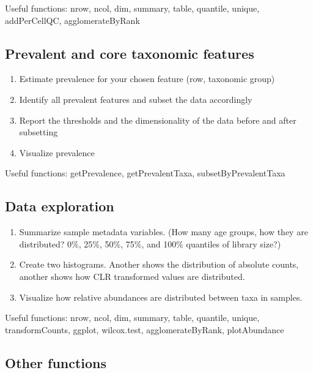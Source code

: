 \documentclass[
]{book}
\providecommand{\tightlist}{%
  \setlength{\itemsep}{0pt}\setlength{\parskip}{0pt}}
\begin{document}
Useful functions: nrow, ncol, dim, summary, table, quantile, unique, addPerCellQC, agglomerateByRank

\hypertarget{prevalent-and-core-taxonomic-features}{%
\subsection{Prevalent and core taxonomic features}\label{prevalent-and-core-taxonomic-features}}

\begin{enumerate}
\def\labelenumi{\arabic{enumi}.}
\tightlist
\item
  Estimate prevalence for your chosen feature (row, taxonomic group)
\item
  Identify all prevalent features and subset the data accordingly
\item
  Report the thresholds and the dimensionality of the data before and after subsetting
\item
  Visualize prevalence
\end{enumerate}

Useful functions: getPrevalence, getPrevalentTaxa, subsetByPrevalentTaxa

\hypertarget{data-exploration}{%
\subsection{Data exploration}\label{data-exploration}}

\begin{enumerate}
\def\labelenumi{\arabic{enumi}.}
\tightlist
\item
  Summarize sample metadata variables. (How many age groups, how they are distributed? 0\%, 25\%, 50\%, 75\%, and 100\% quantiles of library size?)
\item
  Create two histograms. Another shows the distribution of absolute counts, another shows how CLR transformed values are distributed.
\item
  Visualize how relative abundances are distributed between taxa in samples.
\end{enumerate}

Useful functions: nrow, ncol, dim, summary, table, quantile, unique, transformCounts, ggplot, wilcox.test, agglomerateByRank, plotAbundance

\hypertarget{other-functions}{%
\subsection{Other functions}\label{other-functions}}
\end{document}
